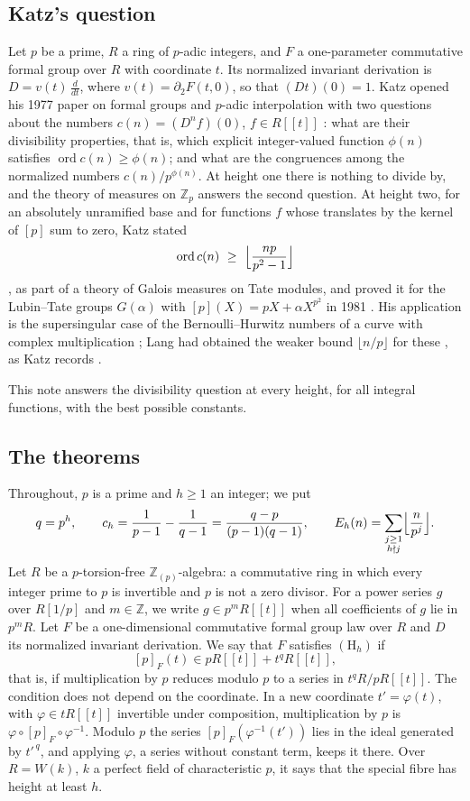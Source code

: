 \documentclass[11pt]{amsart}
\theoremstyle{definition}
\theoremstyle{remark}
\newcommand{\Z}{\mathbb Z}
\begin{document}
\subsection{Katz's question}
Let $p$ be a prime, $R$ a ring of $p$-adic integers, and $F$ a one-parameter commutative formal group over $R$ with coordinate $t$. Its normalized invariant derivation is $D=v(t)\,\frac{d}{dt}$, where $v(t)=\partial_2F(t,0)$, so that $(Dt)(0)=1$. Katz opened his 1977 paper on formal groups and $p$-adic interpolation with two questions about the numbers $c(n)=(D^nf)(0)$, $f\in R[[t]]$ \cite[\S I, pp.~55--56]{Katz77}: what are their divisibility properties, that is, which explicit integer-valued function $\phi(n)$ satisfies $\operatorname{ord}c(n)\ge\phi(n)$; and what are the congruences among the normalized numbers $c(n)/p^{\phi(n)}$. At height one there is nothing to divide by, and the theory of measures on $\Z_p$ answers the second question. At height two, for an absolutely unramified base and for functions $f$ whose translates by the kernel of $[p]$ sum to zero, Katz stated
\[
 \operatorname{ord}c(n)\ \ge\ \Bigl\lfloor\frac{np}{p^2-1}\Bigr\rfloor
\]
\cite[\S V, Lemma 1 and Corollary 2, pp.~62--63]{Katz77}, as part of a theory of Galois measures on Tate modules, and proved it for the Lubin--Tate groups $G(\alpha)$ with $[p](X)=pX+\alpha X^{p^2}$ in 1981 \cite[Main Theorem 3.11(I), p.~672]{Katz81}. His application is the supersingular case of the Bernoulli--Hurwitz numbers of a curve with complex multiplication \cite[\S IV]{Katz81}; Lang had obtained the weaker bound $\lfloor n/p\rfloor$ for these \cite{Lang69}, as Katz records \cite[p.~63]{Katz77}.

This note answers the divisibility question at every height, for all integral functions, with the best possible constants.

\subsection{The theorems}
Throughout, $p$ is a prime and $h\ge1$ an integer; we put
\[
 q=p^h,\qquad c_h=\frac1{p-1}-\frac1{q-1}=\frac{q-p}{(p-1)(q-1)},\qquad
 E_h(n)=\sum_{\substack{j\ge1\\ h\nmid j}}\Bigl\lfloor\frac n{p^j}\Bigr\rfloor .
\]
Let $R$ be a $p$-torsion-free $\Z_{(p)}$-algebra: a commutative ring in which every integer prime to $p$ is invertible and $p$ is not a zero divisor. For a power series $g$ over $R[1/p]$ and $m\in\Z$, we write $g\in p^mR[[t]]$ when all coefficients of $g$ lie in $p^mR$. Let $F$ be a one-dimensional commutative formal group law over $R$ and $D$ its normalized invariant derivation. We say that $F$ satisfies $(\mathrm H_h)$ if
\[
 [p]_F(t)\in pR[[t]]+t^{q}R[[t]] ,
\]
that is, if multiplication by $p$ reduces modulo $p$ to a series in $t^q R/pR[[t]]$. The condition does not depend on the coordinate. In a new coordinate $t'=\varphi(t)$, with $\varphi\in tR[[t]]$ invertible under composition, multiplication by $p$ is $\varphi\circ[p]_F\circ\varphi^{-1}$. Modulo $p$ the series $[p]_F(\varphi^{-1}(t'))$ lies in the ideal generated by $t'^{\,q}$, and applying $\varphi$, a series without constant term, keeps it there. Over $R=W(k)$, $k$ a perfect field of characteristic $p$, it says that the special fibre has height at least $h$.
\end{document}
